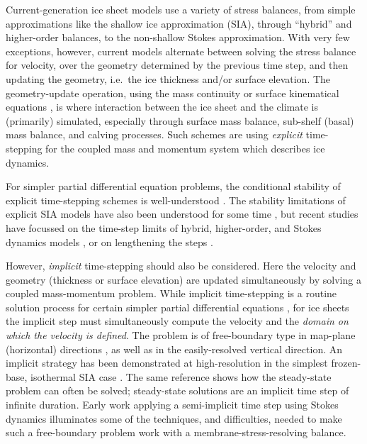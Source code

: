 \documentclass[twocolumn,letterpaper]{igs}
\begin{document}
Current-generation ice sheet models use a variety of stress balances, from simple approximations like the shallow ice approximation (SIA), through ``hybrid'' \citep{Robinsonetal2022,Winkelmannetal2011} and higher-order balances, to the non-shallow Stokes approximation.  With very few exceptions, however, current models alternate between solving the stress balance for velocity, over the geometry determined by the previous time step, and then updating the geometry, i.e.~the ice thickness and/or surface elevation.  The geometry-update operation, using the mass continuity or surface kinematical equations \citep{GreveBlatter2009}, is where interaction between the ice sheet and the climate is (primarily) simulated, especially through surface mass balance, sub-shelf (basal) mass balance, and calving processes.  Such schemes are using \emph{explicit} time-stepping for the coupled mass and momentum system which describes ice dynamics.

For simpler partial differential equation problems, the conditional stability of explicit time-stepping schemes is well-understood \citep{LeVeque2007}.  The stability limitations of explicit SIA models have also been understood for some time \citep{HindmarshPayne1996}, but recent studies have focussed on the time-step limits of hybrid, higher-order, and Stokes dynamics models \citep{Chengetal2017,Robinsonetal2022}, or on lengthening the steps \citep{LofgrenAhlkronaHelanow2021}.

However, \emph{implicit} time-stepping should also be considered.  Here the velocity and geometry (thickness or surface elevation) are updated simultaneously by solving a coupled mass-momentum problem.  While implicit time-stepping is a routine solution process for certain simpler partial differential equations \citep[for example]{LeVeque2007}, for ice sheets the implicit step must simultaneously compute the velocity and the \emph{domain on which the velocity is defined}.  The problem is of free-boundary type in map-plane (horizontal) directions \citep{SchoofHewitt2013}, as well as in the easily-resolved vertical direction.  An implicit strategy has been demonstrated at high-resolution in the simplest frozen-base, isothermal SIA case \citep{Bueler2016}.  The same reference shows how the steady-state problem \citep{JouvetBueler2012} can often be solved; steady-state solutions are an implicit time step of infinite duration.  Early work applying a semi-implicit time step using Stokes dynamics \citep{WirbelJarosch2020} illuminates some of the techniques, and difficulties, needed to make such a free-boundary problem work with a membrane-stress-resolving balance.
\end{document}
